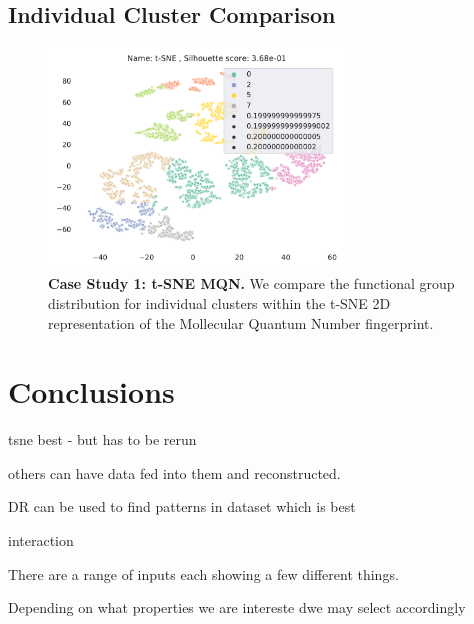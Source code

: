 \subsection{Individual Cluster Comparison}\label{sec:selectcomp}


\begin{figure}[H]
    \includegraphics[width=0.7\textwidth]{outputs/t-SNE/mqn_all.pdf}
    \caption{\textbf{Case Study 1: t-SNE MQN.} We compare the functional group distribution for individual clusters within the t-SNE 2D representation of the Mollecular Quantum Number fingerprint.}
    \label{fig:tsnemqncase}
\end{figure}



\section{Conclusions}

tsne best - but has to be rerun 

others can have data fed into them and reconstructed. 




DR can be used to find patterns in dataset
which is best

interaction

There are a range of inputs
each showing a few different things.

Depending on what properties we are intereste dwe may select accordingly
